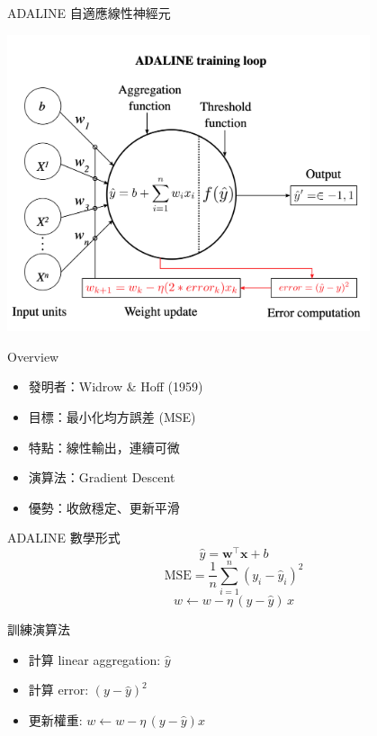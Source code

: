 \documentclass{beamer}
\begin{document}
\begin{frame}{ADALINE 自適應線性神經元}
    \begin{center}
        \includegraphics[width=0.8\textwidth]{ADALINE_picture.png}
    \end{center}
\end{frame}

\begin{frame}{Overview}
\begin{itemize}
\item 發明者：Widrow \& Hoff (1959)
\item 目標：最小化均方誤差 (MSE)
\item 特點：線性輸出，連續可微
\item 演算法：Gradient Descent
\item 優勢：收斂穩定、更新平滑
\end{itemize}
\end{frame}

\begin{frame}{ADALINE 數學形式}
\[
  \hat y = \mathbf{w}^\top \mathbf{x} + b
\]
\[
  \mathrm{MSE} = \frac{1}{n}\sum_{i=1}^n(y_i - \hat y_i)^2
\]
\[
  w \leftarrow w - \eta\,(y - \hat y)\,x
\]
\end{frame}

\begin{frame}{訓練演算法}
\begin{itemize}
\item 計算 linear aggregation: $\hat y$
\item 計算 error: $(y - \hat y)^2$
\item 更新權重: $w \leftarrow w - \eta\,(y - \hat y)x$
\end{itemize}
\end{frame}
\end{document}
